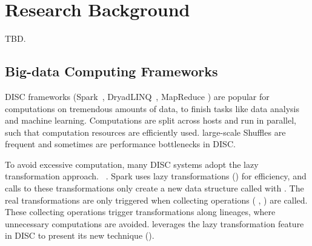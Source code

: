 \vspace{-.15in}\section{Research Background} 
\label{sec:background}\vspace{-.075in}

TBD.


\vspace{-.15in}\subsection{Big-data Computing Frameworks} 
\label{sec:bigdata}\vspace{-.075in}

DISC frameworks (\eg Spark~\cite{nsdi12:spark},
DryadLINQ~\cite{osdi08:dryad}, MapReduce \cite{mapreduce}) are popular for 
computations
on tremendous
amounts of data, to finish tasks like data analysis and machine learning.
Computations are split across hosts and run in parallel, such that
computation resources are efficiently used.
large-scale
Shuffles are frequent and sometimes are performance bottlenecks in DISC.



To avoid excessive computation, many DISC systems adopt the lazy transformation 
approach.
~\cite{pig:vldb08,nsdi12:spark,osdi08:dryad}.
Spark uses lazy transformations (\eg {}) for efficiency,
and calls to these transformations only create a new data structure called 
 with .
The real transformations are only triggered when collecting operations (\eg 
{},
) are called. These collecting operations trigger transformations 
along
lineages, where unnecessary computations are avoided. \xxx leverages the lazy 
transformation
feature in DISC to present its new \lazyp technique ().

